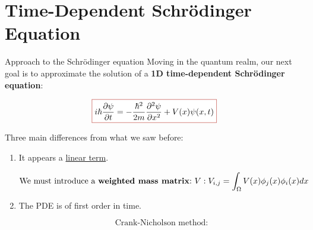 \section{Time-Dependent Schrödinger Equation}

\begin{frame}{Approach to the Schrödinger equation}
    Moving in the quantum realm, our next goal is to approximate the solution of a \textbf{1D time-dependent \textcolor{BrickRed}{Schrödinger equation}}:

    \begin{equation*}
        \fcolorbox{BrickRed}{white}{\text{$\displaystyle i\hbar\frac{\partial\psi}{\partial t}=-\frac{\hbar^2}{2m}\frac{\partial^2\psi}{\partial x^2}+V(x)\psi(x,t)$}}
    \end{equation*}

    Three main differences from what we saw before:

    \begin{enumerate}
        \item It appears a \underline{linear term}.
        
        \begin{equation*}
            \text{We must introduce a \textbf{weighted mass matrix}:} \ V:V_{i,j}=\int_\Omega V(x)\phi_j(x)\phi_i(x)dx
        \end{equation*}
        
        \item The PDE is of first order in time.
        
        \begin{equation*}
            \text{Crank-Nicholson method:}
        \end{equation*}
    \end{enumerate}
\end{frame}